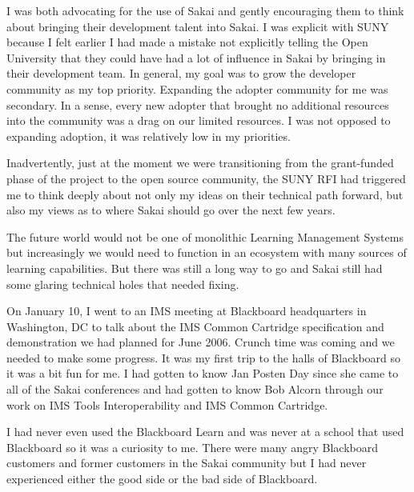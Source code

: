 \documentclass[12pt]{book}
\begin{document}
I was both advocating for the use of Sakai and gently encouraging
them to think about bringing their development talent into Sakai.
I was explicit with SUNY because I felt earlier I had made a mistake
not explicitly telling the Open University that they could have had a lot
of influence in Sakai by bringing in their development team.
In general, my goal was to grow the developer community as my
top priority.   Expanding the adopter community for me was
secondary.  In a sense, every new adopter that brought no
additional resources into the community was a drag on our
limited resources.  I was not opposed to expanding adoption,
it was relatively low in my priorities.

Inadvertently, just at the moment we were transitioning from the
grant-funded phase of the project to the open source community,
the SUNY RFI had triggered me to think deeply about not
only my ideas on their technical path forward, but also my
views as to where Sakai should go over the next few years.

The future world would not be one of monolithic Learning
Management Systems but increasingly we would need to function
in an ecosystem with many sources of learning capabilities.
But there was still a long way to go and Sakai still had some
glaring technical holes that needed fixing.

On January 10, I went to an IMS meeting at
Blackboard headquarters
in Washington, DC to talk about the IMS Common Cartridge
specification and demonstration we had planned for June 2006.  Crunch time was coming
and we needed to make some progress.
It was my first trip to the halls of Blackboard so it was
a bit fun for me.   I had gotten to know Jan Posten Day since she
came to all of the Sakai conferences and had gotten to know
Bob Alcorn through our work on IMS Tools Interoperability
and IMS Common Cartridge.

I had never even used the Blackboard Learn and was never
at a school that used Blackboard so it was a
curiosity to me.   There were many angry Blackboard
customers and former customers in the Sakai community
but I had never experienced either the good side or the
bad side of Blackboard.
\end{document}
